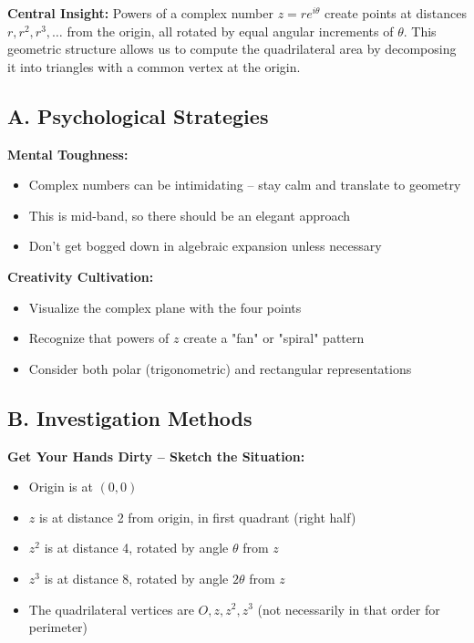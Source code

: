 \documentclass[12pt]{article}
\begin{document}
\vspace{1em}

\begin{keyinsightbox}
\textbf{Central Insight:} Powers of a complex number $z = re^{i\theta}$ create points at distances $r, r^2, r^3, \ldots$ from the origin, all rotated by equal angular increments of $\theta$. This geometric structure allows us to compute the quadrilateral area by decomposing it into triangles with a common vertex at the origin.
\end{keyinsightbox}

\vspace{1em}

\begin{strategicbox}
\subsection*{A. Psychological Strategies}

\textbf{Mental Toughness:}
\begin{itemize}
    \item Complex numbers can be intimidating -- stay calm and translate to geometry
    \item This is mid-band, so there should be an elegant approach
    \item Don't get bogged down in algebraic expansion unless necessary
\end{itemize}

\textbf{Creativity Cultivation:}
\begin{itemize}
    \item Visualize the complex plane with the four points
    \item Recognize that powers of $z$ create a "fan" or "spiral" pattern
    \item Consider both polar (trigonometric) and rectangular representations
\end{itemize}

\subsection*{B. Investigation Methods}

\textbf{Get Your Hands Dirty -- Sketch the Situation:}
\begin{itemize}
    \item Origin is at $(0, 0)$
    \item $z$ is at distance 2 from origin, in first quadrant (right half)
    \item $z^2$ is at distance 4, rotated by angle $\theta$ from $z$
    \item $z^3$ is at distance 8, rotated by angle $2\theta$ from $z$
    \item The quadrilateral vertices are $O, z, z^2, z^3$ (not necessarily in that order for perimeter)
\end{itemize}


\end{strategicbox}
\end{document}
